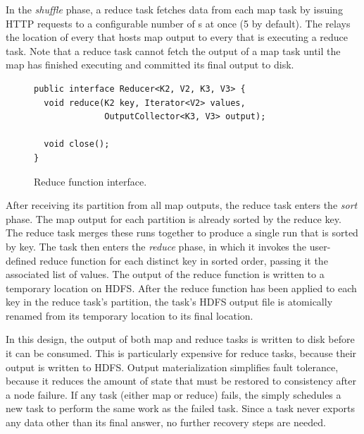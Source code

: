 In the \emph{shuffle} phase, a reduce task fetches data from each map task by
issuing HTTP requests to a configurable number of {\TT}s at once (5 by
default). The {\JT} relays the location of every {\TT} that hosts map output to
every {\TT} that is executing a reduce task. Note that a reduce task cannot
fetch the output of a map task until the map has finished executing and
committed its final output to disk.

\begin{figure}[t]
\begin{minipage}{\linewidth}
\begin{small}
\begin{verbatim}
public interface Reducer<K2, V2, K3, V3> {
  void reduce(K2 key, Iterator<V2> values,
              OutputCollector<K3, V3> output);

  void close();
}
\end{verbatim}
\end{small}
\end{minipage}
\vspace{-4pt}
\caption{Reduce function interface.}
\label{fig:reducefunction}
\end{figure}

After receiving its partition from all map outputs, the reduce task enters the
\emph{sort} phase. The map output for each partition is already sorted by the
reduce key. The reduce task merges these runs together to produce a single run
that is sorted by key. The task then enters the \emph{reduce} phase, in which it
invokes the user-defined reduce function for each distinct key in sorted order,
passing it the associated list of values. The output of the reduce function is
written to a temporary location on HDFS\@. After the reduce function has been
applied to each key in the reduce task's partition, the task's HDFS output file
is atomically renamed from its temporary location to its final location.

In this design, the output of both map and reduce tasks is written to disk
before it can be consumed. This is particularly expensive for reduce tasks,
because their output is written to HDFS\@. Output materialization simplifies
fault tolerance, because it reduces the amount of state that must be restored to
consistency after a node failure. If any task (either map or reduce) fails, the
{\JT} simply schedules a new task to perform the same work as the failed
task. Since a task never exports any data other than its final answer, no
further recovery steps are needed.

